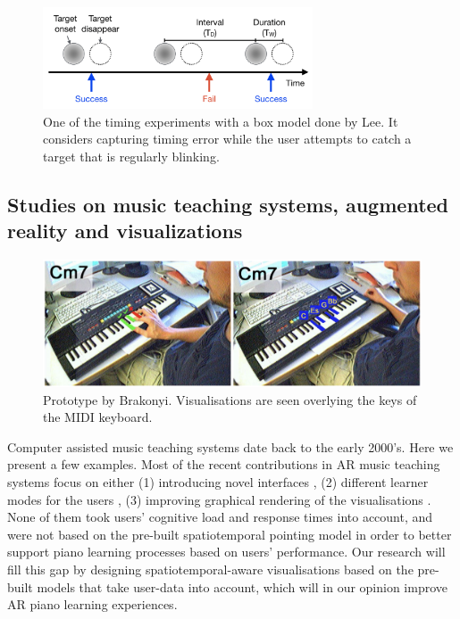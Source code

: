 \documentclass[manuscript,screen]{acmart}
\begin{document}
\begin{figure}[t]
\centering
 \includegraphics[width=8cm]{figures/boxmodel.png}
    \caption{One of the timing experiments with a box model done by Lee. It considers capturing timing error while the user attempts to catch a target that is regularly blinking.
    }\label{fig:boxmodel}
\end{figure}

\subsection{Studies on music teaching systems, augmented reality and visualizations}

\begin{figure}[h]
\centering
 \includegraphics[width=12cm]{figures/barakonyi.png}
    \caption{Prototype by Brakonyi. Visualisations are seen overlying the keys of the MIDI keyboard.
    }\label{fig:barakonyi}
\end{figure}

Computer assisted music teaching systems date back to the early 2000’s. Here we present a few examples. Most of the recent contributions in AR music teaching systems focus on either (1) introducing novel interfaces \cite{barakonyi2005augmented, huang2011piano}, (2) different learner modes for the users \cite{weing2013piano, rogers2014piano}, (3) improving graphical rendering of the visualisations \cite{chow2013music, zheng2013general}. None of them took users’ cognitive load and response times into account, and were not based on the pre-built spatiotemporal pointing model in order to better support piano learning processes based on users’ performance. Our research will fill this gap by designing spatiotemporal-aware visualisations based on the pre-built models that take user-data into account, which will in our opinion improve AR piano learning experiences.\\
\end{document}
